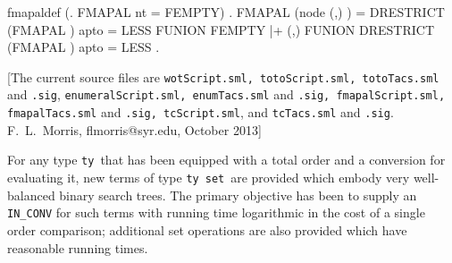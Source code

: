 \begin{SaveVerbatim}{fmapaldef}
\HOLTokenTurnstile{} (\HOLTokenForall{}. FMAPAL  nt = FEMPTY) \HOLTokenConj{}
   \HOLTokenForall{}    .
     FMAPAL  (node  (,) ) =
     DRESTRICT (FMAPAL  ) \HOLTokenLeftbrace{} \HOLTokenBar{} apto    = LESS\HOLTokenRightbrace{} FUNION
     FEMPTY |+ (,) FUNION
     DRESTRICT (FMAPAL  ) \HOLTokenLeftbrace{} \HOLTokenBar{} apto    = LESS\HOLTokenRightbrace{} .
\end{SaveVerbatim}
\newcommand{\bt}{{\tt bt}}
\newcommand{\bl}{{\tt bl}}
\newcommand{\lty}{{\tt ty}}
\newcommand{\typrime}{{\tt ty'}}
\newcommand{\cpn}{{\tt cpn}}
\newcommand{\cmp}{{\tt cmp}}
\newcommand{\toto}{{\tt toto}}
\newcommand{\set}{{\tt set}}
\newcommand{\fmap}{\mbox{\tt fmap}}
\newcommand{\thm}{\mathtt{thm}}
\newcommand{\conv}{\mathtt{conv}}
\newcommand{\ra}{\rightarrow}
%
%
%
%
[The current source files are {\tt wotScript.sml,
totoScript.sml, totoTacs.sml} and {\tt.sig}, {\tt enumeralScript.sml,
enumTacs.sml} and {\tt.sig, fmapalScript.sml, fmapalTacs.sml} and
{\tt.sig, tcScript.sml}, and {\tt tcTacs.sml} and {\tt.sig}.
F.~L.~Morris, flmorris@syr.edu, October 2013]

For any type \lty\ that has been equipped with a total order and a
conversion for evaluating it, new terms of type \lty\ \set\ are provided
which embody very well-balanced binary search trees. The primary
objective has been to supply an \verb$IN_CONV$ for such terms with
running time logarithmic in the cost of a single order comparison;
additional set operations are also provided which have reasonable
running times.

